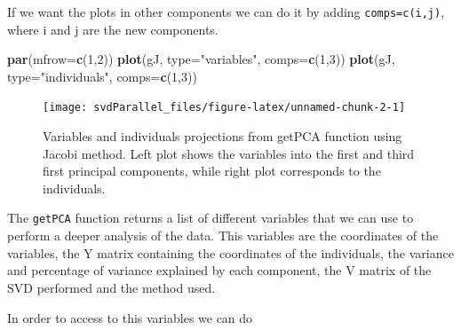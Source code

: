\documentclass[]{article}
\newenvironment{Shaded}{\begin{snugshade}}{\end{snugshade}}
\newcommand{\KeywordTok}[1]{\textcolor[rgb]{0.13,0.29,0.53}{\textbf{#1}}}
\newcommand{\DataTypeTok}[1]{\textcolor[rgb]{0.13,0.29,0.53}{#1}}
\newcommand{\DecValTok}[1]{\textcolor[rgb]{0.00,0.00,0.81}{#1}}
\newcommand{\FloatTok}[1]{\textcolor[rgb]{0.00,0.00,0.81}{#1}}
\newcommand{\StringTok}[1]{\textcolor[rgb]{0.31,0.60,0.02}{#1}}
\newcommand{\OperatorTok}[1]{\textcolor[rgb]{0.81,0.36,0.00}{\textbf{#1}}}
\newcommand{\NormalTok}[1]{#1}
\begin{document}
If we want the plots in other components we can do it by adding
\texttt{comps=c(i,j)}, where i and j are the new components.

\begin{Shaded}
\begin{Highlighting}[]
\KeywordTok{par}\NormalTok{(}\DataTypeTok{mfrow=}\KeywordTok{c}\NormalTok{(}\DecValTok{1}\NormalTok{,}\DecValTok{2}\NormalTok{))}
\KeywordTok{plot}\NormalTok{(gJ, }\DataTypeTok{type=}\StringTok{"variables"}\NormalTok{, }\DataTypeTok{comps=}\KeywordTok{c}\NormalTok{(}\DecValTok{1}\NormalTok{,}\DecValTok{3}\NormalTok{))}
\KeywordTok{plot}\NormalTok{(gJ, }\DataTypeTok{type=}\StringTok{"individuals"}\NormalTok{, }\DataTypeTok{comps=}\KeywordTok{c}\NormalTok{(}\DecValTok{1}\NormalTok{,}\DecValTok{3}\NormalTok{))}
\end{Highlighting}
\end{Shaded}

\begin{figure}

{\centering \texttt{[image: svdParallel\_files/figure-latex/unnamed-chunk-2-1]} 

}

\caption{Variables and individuals projections from getPCA function using Jacobi method. Left plot shows the variables into the first and third first principal components, while right plot corresponds to the individuals.}\label{fig:unnamed-chunk-2}
\end{figure}

The \texttt{getPCA} function returns a list of different variables that
we can use to perform a deeper analysis of the data. This variables are
the coordinates of the variables, the Y matrix containing the
coordinates of the individuals, the variance and percentage of variance
explained by each component, the V matrix of the SVD performed and the
method used.

In order to access to this variables we can do

\begin{Shaded}
\end{Shaded}
\end{document}
